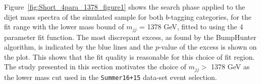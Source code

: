 Figure~\ref{fig:Short_4para_1378_figure1} shows the search phase applied to the dijet mass spectra
of the simulated sample for both $b$-tagging categories,
for the fit range with the lower mass bound of $m_{jj}$ = 1378 GeV,
fitted to using the 4 parameter fit function.
The most discrepant excess, as found by the BumpHunter algorithm, is indicated by the blue lines
and the $p$-value of the excess is shown on the plot.
This shows that the fit quality is reasonable for this choice of fit region.
The study presented in this section motivates the choice of $m_{jj} >$ 1378 GeV
as the lower mass cut used in the \verb|Summer16+15| data-set event selection.

\begin{figure}[!htb]
  \begin{center}
    \captionsetup[subfigure]{aboveskip=0pt,justification=centering}
    \\
  \end{center}

\end{figure}
